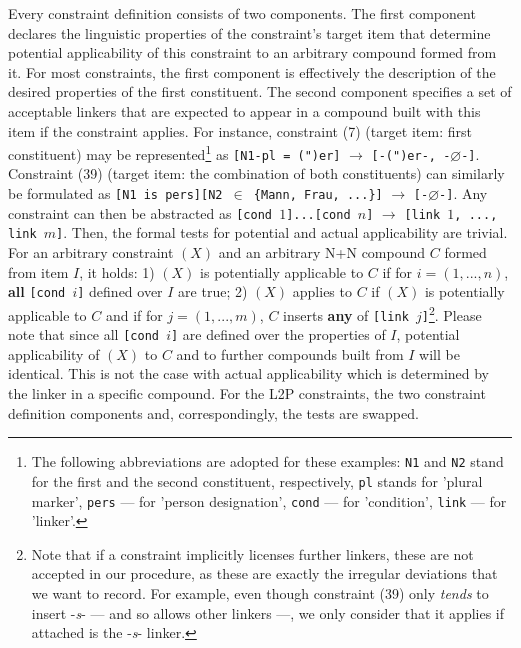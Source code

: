\documentclass[10pt, a4paper]{article}
\newcommand{\zeroLinker}{\ensuremath{\boldsymbol{\varnothing}}}
\begin{document}
Every constraint definition consists of two components. The first component declares the linguistic properties of the constraint's target item that determine potential applicability of this constraint to an arbitrary compound formed from it. For most constraints, the first component is effectively the description of the desired properties of the first constituent. The second component specifies a set of acceptable linkers that are expected to appear in a compound built with this item if the constraint applies. For instance, constraint (7) (target item: first constituent) may be represented\footnote{The following abbreviations are adopted for these examples: \texttt{N1} and \texttt{N2} stand for the first and the second constituent, respectively, \texttt{pl} stands for 'plural marker', \texttt{pers} --- for 'person designation', \texttt{cond} --- for 'condition', \texttt{link} --- for 'linker'.} as \mbox{\texttt{[N1-pl = (")er]}} $\rightarrow$ \mbox{\texttt{[-(")er-, -{\zeroLinker}-]}}. Constraint (39) (target item: the combination of both constituents) can similarly be formulated as \mbox{\texttt{[N1 is pers][N2 $\in$ \{Mann, Frau, ...\}]}} $\rightarrow$ \mbox{\texttt{[-{\zeroLinker}-]}}. Any constraint can then be abstracted as \mbox{\texttt{[cond $1$]...[cond $n$]}} $\rightarrow$ \mbox{\texttt{[link $1$, ..., link $m$]}}. Then, the formal tests for potential and actual applicability are trivial. For an arbitrary constraint $(X)$ and an arbitrary N+N compound $C$ formed from item $I$, it holds: 1) $(X)$ is potentially applicable to $C$ if for \mbox{$i = (1, ..., n)$}, \textbf{all} \mbox{\texttt{[cond $i$]}} defined over $I$ are true; 2) $(X)$ applies to $C$ if $(X)$ is potentially applicable to $C$ and if for \mbox{$j = (1, ..., m)$}, $C$ inserts \textbf{any} of \mbox{\texttt{[link $j$]}}\footnote{Note that if a constraint implicitly licenses further linkers, these are not accepted in our procedure, as these are exactly the irregular deviations that we want to record. For example, even though constraint (39) only \textit{tends} to insert \mbox{-\textit{s}-} --- and so allows other linkers ---, we only consider that it applies if attached is the \mbox{-\textit{s}-} linker.}. Please note that since all \mbox{\texttt{[cond $i$]}} are defined over the properties of $I$, potential applicability of $(X)$ to $C$ and to further compounds built from $I$ will be identical. This is not the case with actual applicability which is determined by the linker in a specific compound. For the L2P constraints, the two constraint definition components and, correspondingly, the tests are swapped.
\end{document}
